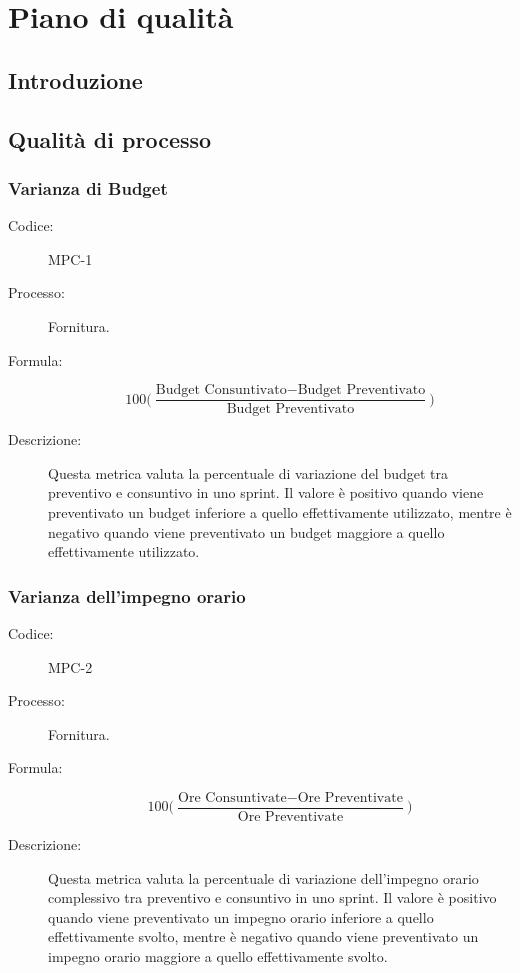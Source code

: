 \chapter{Piano di qualità}

\section{Introduzione}

\section{Qualità di processo} \label{sec:qualityproc}
\subsection{Varianza di Budget}
\begin{description}
    \item[Codice:] MPC-1
    \item[Processo:] Fornitura.
    \item[Formula:] 
    \begin{equation}
        100\biggl(\frac{\text{Budget Consuntivato} - \text{Budget Preventivato}}{\text{Budget Preventivato}}\biggr)
    \end{equation}
    \item[Descrizione:] Questa metrica valuta la percentuale di variazione del budget tra preventivo e consuntivo in uno sprint. Il valore è positivo quando viene preventivato un budget inferiore a quello effettivamente utilizzato, mentre è negativo quando viene preventivato un budget maggiore a quello effettivamente utilizzato.
\end{description}

\subsection{Varianza dell’impegno orario}
\begin{description}
    \item[Codice:] MPC-2
    \item[Processo:] Fornitura.
    \item[Formula:]
    \begin{equation}
        100\biggl(\frac{\text{Ore Consuntivate} - \text{Ore Preventivate}}{\text{Ore Preventivate}}\biggr)
    \end{equation}
    \item[Descrizione:] Questa metrica valuta la percentuale di variazione dell'impegno orario complessivo tra preventivo e consuntivo in uno sprint. Il valore è positivo quando viene preventivato un impegno orario inferiore a quello effettivamente svolto, mentre è negativo quando viene preventivato un impegno orario maggiore a quello effettivamente svolto.
\end{description}

